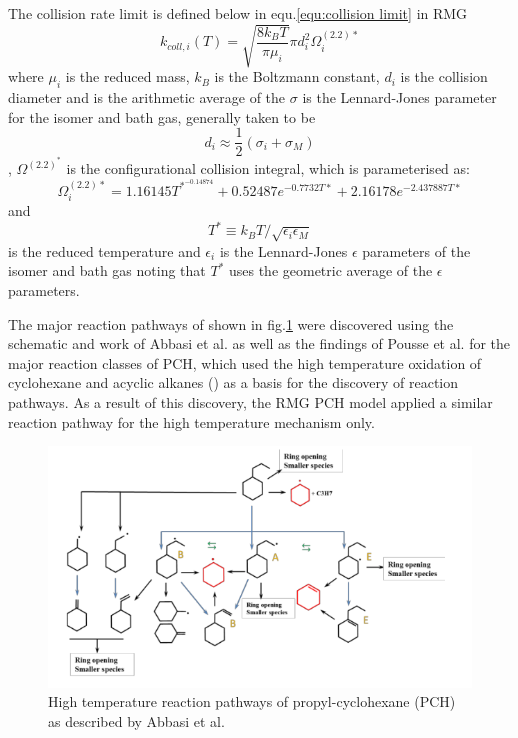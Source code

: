 The collision rate limit is defined below in equ.\ref{equ:collision limit} in RMG 
\begin{equation}
    k_{coll,i}(T)= \sqrt{\frac{8k_BT}{\pi\mu_i}}\pi d_{i}^2\Omega_{i}^{(2.2)*}
    \label{equ:collision limit}
\end{equation}
where $\mu_i$ is the reduced mass, $k_B$ is the Boltzmann constant, $d_i$ is the collision diameter and is the arithmetic average of the $\sigma$ is the Lennard-Jones parameter for the isomer and bath gas, generally taken to be 
\begin{equation}
    d_{i} \approx \frac{1}{2}(\sigma_i + \sigma_M)
\end{equation},  $\Omega^{(2.2)^*}$ is the configurational collision integral, which is parameterised as:
\begin{equation}
    \Omega_{i}^{(2.2)*} = 1.16145T^{*^{-0.14874}}+0.52487e^{-0.7732T*}+2.16178e^{-2.437887T*}
\end{equation} 
and \begin{equation}
    T^* \equiv k_BT / \sqrt{\epsilon_i\epsilon_M}
\end{equation} is the reduced temperature and $\epsilon_i$ is the Lennard-Jones $\epsilon$ parameters of the isomer and bath gas noting that $T^*$ uses the geometric average of the $\epsilon$ parameters.

The major reaction pathways of shown in fig.\ref{fig:pch-pathways} were discovered using the schematic and work of Abbasi et al.\cite{Abbasi2018KineticFormation} as well as the findings of Pousse et al. \cite{Pousse2010LeanN-Propylcyclohexane} for the major reaction classes of PCH, which used the high temperature oxidation of cyclohexane and acyclic alkanes () as a basis for the discovery of reaction pathways. As a result of this discovery, the RMG PCH model applied a similar reaction pathway for the high temperature mechanism only. 

\begin{figure}[hbp]
    \centering
    \includegraphics[scale=0.5, keepaspectratio]{images/PCH-schematic.png}
    \caption{High temperature reaction pathways of propyl-cyclohexane (PCH) as described by Abbasi et al. \cite{Abbasi2018KineticFormation}}
    \label{fig:pch-pathways}
\end{figure}


